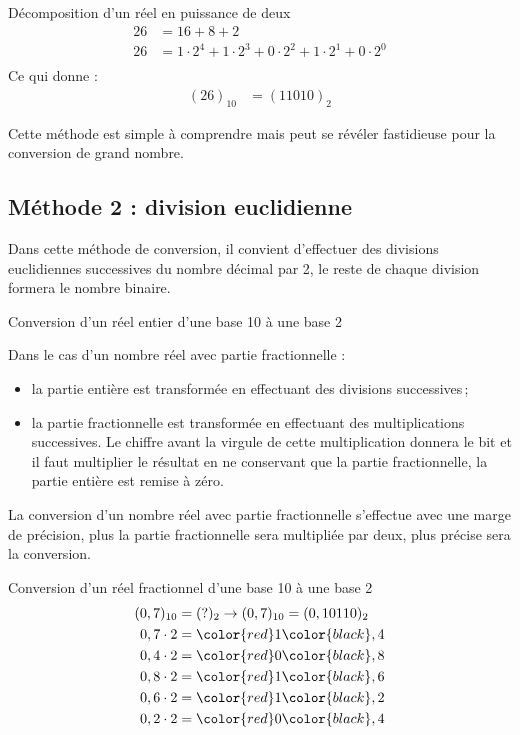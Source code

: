 \documentclass[a4paper, 11pt, twoside, fleqn]{memoir}
\begin{document}
\begin{exemple}{Décomposition d'un réel en puissance de deux}{}
\begin{align*}
26 	&= 16 + 8 + 2\\
26	&=1\cdot2^4 + 1\cdot2^3+0\cdot2^2+1\cdot2^1+0\cdot2^0\\
\end{align*}
Ce qui donne :
\begin{align*}
(26)_{10} &= (11010)_2
\end{align*}
\end{exemple}

Cette méthode est simple à comprendre mais peut se révéler fastidieuse pour la conversion de grand nombre.

\subsection{Méthode 2 : division euclidienne}	

Dans cette méthode de conversion, il convient d'effectuer des divisions euclidiennes successives du nombre décimal par 2, le reste de chaque division formera le nombre binaire.
\begin{exemple}{Conversion d'un réel entier d'une base 10 à une base 2}{}
\hfill	{}

\end{exemple}

Dans le cas d'un nombre réel avec partie fractionnelle :
\begin{itemize}
\item la partie entière est transformée en effectuant des divisions successives\,;
\item la partie fractionnelle est transformée en effectuant des multiplications successives. Le chiffre avant la virgule de cette multiplication donnera le bit et il faut multiplier le résultat en ne conservant que la partie fractionnelle, la partie entière est remise à zéro.
\end{itemize}
 
 La conversion d'un nombre réel avec partie fractionnelle s'effectue avec une marge de précision, plus la partie fractionnelle sera multipliée par deux, plus précise sera la conversion.

\begin{exemple}{Conversion d'un réel fractionnel d'une base 10 à une base 2}{}
\begin{align*}
(0,7)_{10} &= (?)_2 \rightarrow (0,7)_{10} = (0,10110)_2\\
0,7\cdot2 &= \color{red}1\color{black},4\\
0,4\cdot2 &= \color{red}0\color{black},8\\
0,8\cdot2 &= \color{red}1\color{black},6\\
0,6\cdot2 &= \color{red}1\color{black},2\\
0,2\cdot2 &= \color{red}0\color{black},4\\
\end{align*}
\end{exemple}
\end{document}
